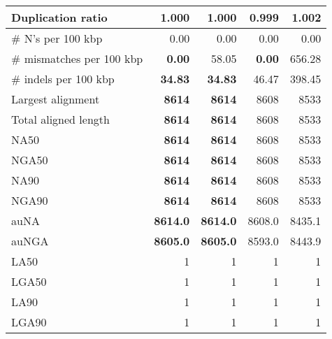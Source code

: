 \documentclass[12pt,a4paper]{article}
\begin{document}
\begin{table}[ht]
\begin{center}
\begin{tabular}{|l*{4}{|r}|}
Duplication ratio & 1.000 & 1.000 & {\bf 0.999} & 1.002 \\ \hline
\# N's per 100 kbp & 0.00 & 0.00 & 0.00 & 0.00 \\ \hline
\# mismatches per 100 kbp & {\bf 0.00} & 58.05 & {\bf 0.00} & 656.28 \\ \hline
\# indels per 100 kbp & {\bf 34.83} & {\bf 34.83} & 46.47 & 398.45 \\ \hline
Largest alignment & {\bf 8614} & {\bf 8614} & 8608 & 8533 \\ \hline
Total aligned length & {\bf 8614} & {\bf 8614} & 8608 & 8533 \\ \hline
NA50 & {\bf 8614} & {\bf 8614} & 8608 & 8533 \\ \hline
NGA50 & {\bf 8614} & {\bf 8614} & 8608 & 8533 \\ \hline
NA90 & {\bf 8614} & {\bf 8614} & 8608 & 8533 \\ \hline
NGA90 & {\bf 8614} & {\bf 8614} & 8608 & 8533 \\ \hline
auNA & {\bf 8614.0} & {\bf 8614.0} & 8608.0 & 8435.1 \\ \hline
auNGA & {\bf 8605.0} & {\bf 8605.0} & 8593.0 & 8443.9 \\ \hline
LA50 & 1 & 1 & 1 & 1 \\ \hline
LGA50 & 1 & 1 & 1 & 1 \\ \hline
LA90 & 1 & 1 & 1 & 1 \\ \hline
LGA90 & 1 & 1 & 1 & 1 \\ \hline
\end{tabular}
\end{center}
\end{table}
\end{document}
